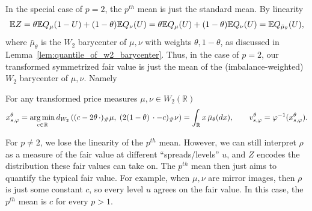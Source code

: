 \begin{subappendices}
In the special case of $p=2$, the $p^{th}$ mean is just the standard mean. By linearity
%
\[\mathbb{E} Z = \theta \mathbb{E} Q_\mu(1-U) + (1-\theta) \mathbb{E} Q_\nu(U) = \theta \mathbb{E} Q_\mu(U) + (1-\theta) \mathbb{E} Q_\nu(U) =\mathbb{E} Q_{\bar{\mu}_\theta}(U), \]
%
\noindent where $\bar{\mu}_\theta$ is the $W_2$ barycenter of $\mu, \nu$ with weights $\theta, 1-\theta$, as discussed in
Lemma~\ref{lem:quantile_of_w2_barycenter}. Thus, in the case of $p=2$, our transformed symmetrized fair value is just the mean of the
(imbalance-weighted) $W_2$ barycenter of $\mu, \nu$. Namely
%
\begin{corollary}
\label{corr:w2_fv_is_mean_barycenter} For any transformed price measures $\mu,\nu\in W_2(\mathbb R)$
%
    \[x_{s,\varphi}^\theta = \operatorname*{arg\,min}_{c \in \mathbb R} d_{W_2}\left((c-2\theta\,\cdot)_\#\mu, \; (2(1-\theta)\,\cdot-c)_\#\nu\right)
    = \int_\mathbb R x\,\bar{\mu}_\theta(dx),
    \qquad v_{s,\varphi}^\theta=\varphi^{-1}(x_{s,\varphi}^\theta).\]
\end{corollary}
%
For $p \neq 2$, we lose the linearity of the $p^{th}$ mean. However, we can still
interpret $\rho$ as a measure of the fair value at different ``spreads/levels'' $u$, and $Z$
encodes the distribution these fair values can take on. The $p^{th}$ mean then just aims to quantify
the typical fair value. For example, when $\mu, \nu$ are mirror
images, then $\rho$ is just some constant $c$, so every level $u$ agrees on the fair value. In this case,
the $p^{th}$ mean is $c$ for every $p>1$.


\end{subappendices}

